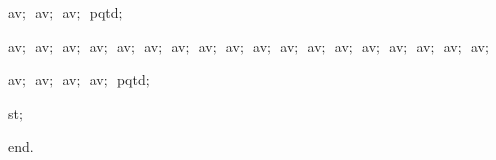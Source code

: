 {\vspace{\neglskip}\mbox{\blc  \blk\idt  av$;$\ av$;$\ av$;$\ pqtd$;$}\par 
\vspace{\neglskip}\mbox{\blc  \blk\idt  av$;$\ av$;$\ av$;$\ av$;$\ av$;$\ av$;$\ av$;$\ av$;$\ av$;$\ av$;$\ av$;$\ av$;$\ av$;$\ av$;$\ av$;$\ av$;$\ av$;$\ av$;$\ }\par 
\vspace{\neglskip}\mbox{\blc  \blk\idt  av$;$\ av$;$\ av$;$\ av$;$\ pqtd$;$}\par 
\vspace{\neglskip}\mbox{\blc  \blk\idt  st$;$}\par 
\vspace{\neglskip}\mbox{\blc  \idt  \mcl end\idt $.$}\par 

\medskip }

